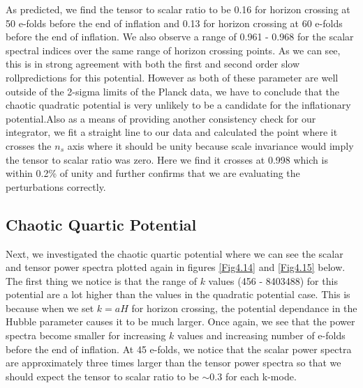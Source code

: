 \documentclass[a4paper,12pt,twoside]{report}
\begin{document}
As predicted, we find the tensor to scalar ratio to be 0.16 for horizon crossing at 50 e-folds before the end of inflation and 0.13 for horizon crossing at 60 e-folds before the end of inflation. We also observe a range of 0.961 - 0.968 for the scalar spectral indices over the same range of horizon crossing points. As we can see, this is in strong agreement with both the first and second order slow rollpredictions for this potential. However as both of these parameter  are well outside of the 2-sigma limits of the Planck data, we have to conclude that the chaotic quadratic potential is very unlikely to be a candidate for the inflationary potential.Also as a means of providing another consistency check for our integrator, we fit a straight line to our data and calculated the point where it crosses the $n_{s}$ axis where it should be unity because scale invariance would imply the tensor to scalar ratio was zero. Here we find it crosses at 0.998 which is within 0.2\% of unity and further confirms that we are evaluating the perturbations correctly.

\subsection{Chaotic Quartic Potential} \label{subsec:Res_Pert_Quart}

Next, we investigated the chaotic quartic potential where we can see the scalar and tensor power spectra plotted again in figures \ref{Fig4.14} and \ref{Fig4.15} below. The first thing we notice is that the range of $k$ values (456 - 8403488) for this potential are a lot higher than the values in the quadratic potential case. This is because when we set $k = aH$ for horizon crossing, the potential dependance in the Hubble parameter causes it to be much larger. Once again, we see that the power spectra become smaller for increasing $k$ values and increasing number of e-folds before the end of inflation. At 45 e-folds, we notice that the scalar power spectra are approximately three times larger than the tensor power spectra so that we should expect the tensor to scalar ratio to be $\sim 0.3$ for each k-mode.
\end{document}
